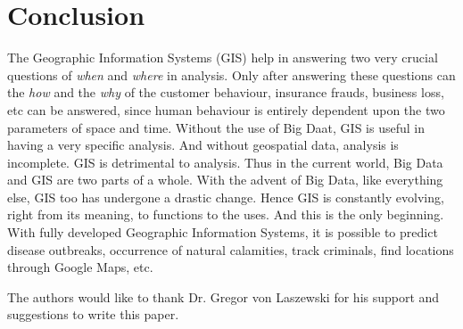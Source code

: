 \section{Conclusion}
The Geographic Information Systems (GIS) help in answering two very crucial questions of \emph{when} and \emph{where} in analysis. Only after answering these questions can the \emph{how} and the \emph{why} of the customer behaviour, insurance frauds, business loss, etc can be answered, since human behaviour is entirely dependent upon the two parameters of space and time. Without the use of Big Daat, GIS is useful in having a very specific analysis. And without geospatial data, analysis is incomplete. GIS is detrimental to analysis. Thus in the current world, Big Data and GIS are two parts of a whole. With the advent of Big Data, like everything else, GIS too has undergone a drastic change. Hence GIS is constantly evolving, right from its meaning, to functions to the uses. And this is the only beginning. With fully developed Geographic Information Systems, it is possible to predict disease outbreaks, occurrence of natural calamities, track criminals, find locations through Google Maps, etc. 


\begin{acks}

  The authors would like to thank Dr. Gregor von Laszewski for his
  support and suggestions to write this paper.

\end{acks}


 

